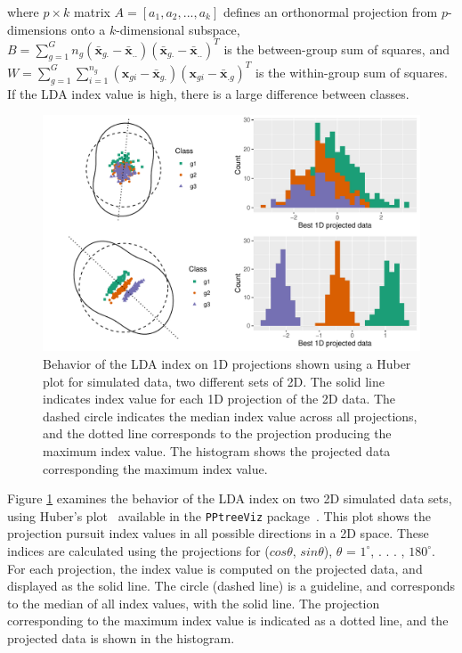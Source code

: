 \documentclass[12pt]{article}\usepackage[]{graphicx}\usepackage[]{color}
\makeatletter
\def\maxwidth{ %
  \ifdim\Gin@nat@width>\linewidth
    \linewidth
  \else
    \Gin@nat@width
  \fi
}
\newenvironment{knitrout}{}{} %
\makeatother
\begin{document}
\noindent where $p\times k$ matrix $A = [a_1, a_2 , . . . , a_k ]$ defines an orthonormal projection from $p$-dimensions onto a $k$-dimensional subspace, 
$B=\sum_{g=1}^G n_g(\bar{\mathbf{x}}_{g.}-\bar{\mathbf{x}}_{..})(\bar{\mathbf{x}}_{g.}-\bar{\mathbf{x}}_{..})^{T}$ is the between-group sum of squares, and 
$W=\sum_{g=1}^{G}\sum_{i=1}^{n_g}(\mathbf{x}_{gi}-\bar{\mathbf{x}}_{g.})(\mathbf{x}_{gi}-\bar{\mathbf{x}}_{.g})^T$ is the within-group sum of squares. If the LDA index value is high, there is a large difference between classes.

 
\begin{figure}[!t]
\begin{knitrout}
\color{fgcolor}
\includegraphics[width=\maxwidth]{figure/huber-1} 

\end{knitrout}
\caption{Behavior of the LDA index on 1D projections shown using a Huber plot for simulated data, two different sets of 2D. The solid line indicates index value for each 1D projection of the 2D data. The dashed circle indicates the median index value across all projections, and the dotted line corresponds to the projection producing the maximum index value. The histogram shows the projected data corresponding the maximum index value. \label{huberpl}}
\end{figure}

Figure \ref{huberpl} examines the behavior of the LDA index on two 2D simulated data sets, using Huber's plot~\citep{huber1990data} available in the \texttt{PPtreeViz} package~\citep{PPtreeViz}. This plot shows the projection pursuit index values in all possible directions in a 2D space. These indices are calculated using the projections for ($cos \theta$, $sin \theta$), $\theta$ = $1^{\circ}$, . . . , $180^{\circ}$. For each projection, the index value is computed on the projected data, and displayed as the solid line. The circle (dashed line) is a guideline, and corresponds to the median of all index values, with the solid line. The projection corresponding to the maximum index value is indicated as a dotted line, and the projected data is shown in the histogram. 
 
\end{document}

